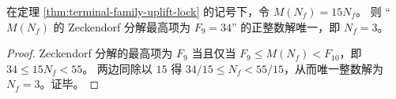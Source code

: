 \begin{corollary}[\texorpdfstring{$\delta=34$}{δ=34} 分支锁定的三代唯一性]\label{cor:window6-delta-lock-unique-three-families}
在定理 \ref{thm:terminal-family-uplift-lock} 的记号下，令 \(M(N_f)=15N_f\)。
则 “\(M(N_f)\) 的 Zeckendorf 分解最高项为 \(F_9=34\)” 的正整数解唯一，即 \(N_f=3\)。
\end{corollary}
\begin{proof}
Zeckendorf 分解的最高项为 \(F_9\) 当且仅当 \(F_9\le M(N_f)<F_{10}\)，即
\(
34\le 15N_f<55
\)。
两边同除以 \(15\) 得 \(34/15\le N_f<55/15\)，从而唯一整数解为 \(N_f=3\)。证毕。
\end{proof}

